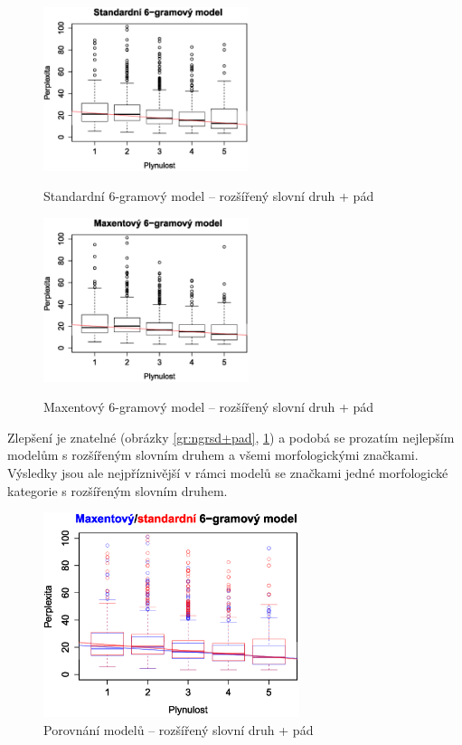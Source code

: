 \documentclass[12pt,a4paper]{report}
\begin{document}
\begin{figure}[!htb]
\begin{center}
  \centering\includegraphics[width=60mm]{./grafy/morf/ngram/rsd+pad.svg.eps}
  \caption{Standardní 6-gramový model -- rozšířený slovní druh + pád}\label{gr:ngrsd+pad}
\endminipage\quad
{}
  \centering\includegraphics[width=60mm]{./grafy/morf/maxent/rsd+pad.svg.eps}
  \caption{Maxentový 6-gramový model -- rozšířený slovní druh + pád}\label{gr:maxrsd+pad}
\endminipage
\end{center}
\end{figure}

Zlepšení je znatelné (obrázky \ref{gr:ngrsd+pad}, \ref{gr:maxrsd+pad}) a podobá se prozatím nejlepším modelům s rozšířeným slovním druhem a všemi morfologickými značkami. Výsledky jsou ale nejpříznivější v rámci modelů se značkami jedné morfologické kategorie s rozšířeným slovním druhem.

\begin{figure}[!htbp]
\begin{center}
	\centering
	\includegraphics[width=75mm]{./grafy/morf/porovnani/rsd+pad.eps}	
	\caption{Porovnání modelů -- rozšířený slovní druh + pád}\label{gr:porrsd+pad}
\endminipage
\end{center}
\end{figure}
\end{document}
